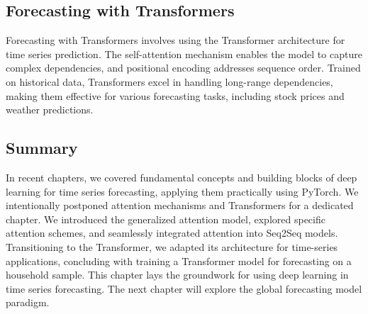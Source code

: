 \documentclass{article}
\begin{document}
\subsection{Forecasting with Transformers}
Forecasting with Transformers involves using the Transformer architecture for time series prediction. The self-attention mechanism enables the model to capture complex dependencies, and positional encoding addresses sequence order. Trained on historical data, Transformers excel in handling long-range dependencies, making them effective for various forecasting tasks, including stock prices and weather predictions.

\subsection{Summary}
In recent chapters, we covered fundamental concepts and building blocks of deep learning for time series forecasting, applying them practically using PyTorch. We intentionally postponed attention mechanisms and Transformers for a dedicated chapter. We introduced the generalized attention model, explored specific attention schemes, and seamlessly integrated attention into Seq2Seq models. Transitioning to the Transformer, we adapted its architecture for time-series applications, concluding with training a Transformer model for forecasting on a household sample. This chapter lays the groundwork for using deep learning in time series forecasting. The next chapter will explore the global forecasting model paradigm.
\end{document}
